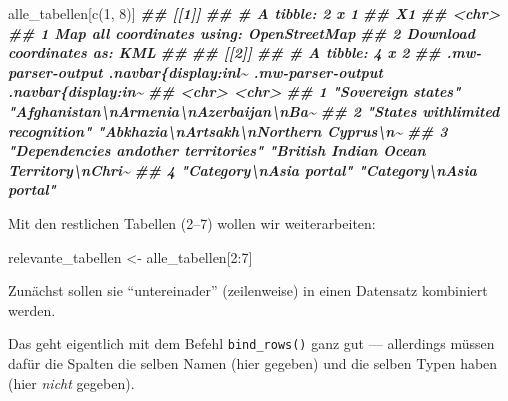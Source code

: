 \documentclass[
  ngerman,
]{article}
\newenvironment{Shaded}{\begin{snugshade}}{\end{snugshade}}
\newcommand{\DecValTok}[1]{\textcolor[rgb]{0.00,0.00,0.81}{#1}}
\newcommand{\DocumentationTok}[1]{\textcolor[rgb]{0.56,0.35,0.01}{\textbf{\textit{#1}}}}
\newcommand{\FunctionTok}[1]{\textcolor[rgb]{0.00,0.00,0.00}{#1}}
\newcommand{\NormalTok}[1]{#1}
\newcommand{\OtherTok}[1]{\textcolor[rgb]{0.56,0.35,0.01}{#1}}
\newcommand{\SpecialCharTok}[1]{\textcolor[rgb]{0.00,0.00,0.00}{#1}}
\begin{document}
\begin{Shaded}
\begin{Highlighting}[]
\NormalTok{alle\_tabellen[}\FunctionTok{c}\NormalTok{(}\DecValTok{1}\NormalTok{, }\DecValTok{8}\NormalTok{)]}
\DocumentationTok{\#\# [[1]]}
\DocumentationTok{\#\# \# A tibble: 2 x 1}
\DocumentationTok{\#\#   X1                                      }
\DocumentationTok{\#\#   \textless{}chr\textgreater{}                                   }
\DocumentationTok{\#\# 1 Map all coordinates using: OpenStreetMap}
\DocumentationTok{\#\# 2 Download coordinates as: KML            }
\DocumentationTok{\#\# }
\DocumentationTok{\#\# [[2]]}
\DocumentationTok{\#\# \# A tibble: 4 x 2}
\DocumentationTok{\#\#   \textasciigrave{}.mw{-}parser{-}output .navbar\{display:inl\textasciitilde{} \textasciigrave{}.mw{-}parser{-}output .navbar\{display:in\textasciitilde{}}
\DocumentationTok{\#\#   \textless{}chr\textgreater{}                                   \textless{}chr\textgreater{}                                 }
\DocumentationTok{\#\# 1 "Sovereign states"                      "Afghanistan\textbackslash{}nArmenia\textbackslash{}nAzerbaijan\textbackslash{}nBa\textasciitilde{}}
\DocumentationTok{\#\# 2 "States withlimited recognition"        "Abkhazia\textbackslash{}nArtsakh\textbackslash{}nNorthern Cyprus\textbackslash{}n\textasciitilde{}}
\DocumentationTok{\#\# 3 "Dependencies andother territories"     "British Indian Ocean Territory\textbackslash{}nChri\textasciitilde{}}
\DocumentationTok{\#\# 4 "Category\textbackslash{}nAsia portal"                 "Category\textbackslash{}nAsia portal"}
\end{Highlighting}
\end{Shaded}

Mit den restlichen Tabellen (2--7) wollen wir weiterarbeiten:

\begin{Shaded}
\begin{Highlighting}[]
\NormalTok{relevante\_tabellen }\OtherTok{\textless{}{-}}\NormalTok{ alle\_tabellen[}\DecValTok{2}\SpecialCharTok{:}\DecValTok{7}\NormalTok{]}
\end{Highlighting}
\end{Shaded}

Zunächst sollen sie ``untereinader'' (zeilenweise) in einen Datensatz kombiniert werden.

Das geht eigentlich mit dem Befehl \texttt{bind\_rows()} ganz gut --- allerdings müssen dafür die Spalten die selben Namen (hier gegeben) und die selben Typen haben (hier \emph{nicht} gegeben).
\end{document}
